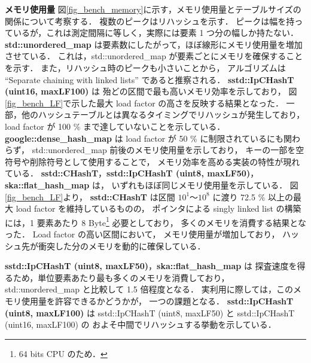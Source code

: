 %
{\bf メモリ使用量}
\samepage\newline\indent
図\ref{fig_bench_memory}に示す，メモリ使用量とテーブルサイズの関係について考察する．
複数のピークはリハッシュを示す．
ピークは幅を持っているが，これは測定間隔に等しく，実際には要素 1 つ分の幅しか持たない．
{\bf std::unordered\_map} は要素数にしたがって，ほぼ線形にメモリ使用量を増加させている．
これは，std::unordered\_map が要素ごとにメモリを確保することを示す．
また，リハッシュ時のピークも小さいことから，
アルゴリズムは ``Separate chaining with linked lists'' であると推察される．
{\bf sstd::IpCHashT (uint16, maxLF100)} は
殆どの区間で最も高いメモリ効率を示しており，
図\ref{fig_bench_LF}で示した最大 load factor の高さを反映する結果となった．
一部，他のハッシュテーブルとは異なるタイミングでリハッシュが発生しており，
load factor が 100 \% まで達していないことを示している．
{\bf google::dense\_hash\_map} は
load factor が 50 \% に制限されているにも関わらず，
std::unordered\_map 前後のメモリ使用量を示しており，
キーの一部を空符号や削除符号として使用することで，
メモリ効率を高める実装の特性が現れている．
{\bf sstd::CHashT}，{\bf sstd::IpCHashT (uint8, maxLF50)}，{\bf ska::flat\_hash\_map} は，
いずれもほぼ同じメモリ使用量を示している．
図\ref{fig_bench_LF}より，
{\bf sstd::CHashT} は区間 $10^1〜10^8$ に渡り 72.5 \% 以上の最大 load factor を維持しているものの，
ポインタによる singly linked list の構築には，1 要素あたり 8 Byte\footnote{64 bits CPU のため．} 必要としており，
多くのメモリを消費する結果となった．
Load factor の高い区間において，
メモリ使用量が増加しており，
ハッシュ先が衝突した分のメモリを動的に確保している．

\noindent
{\bf sstd::IpCHashT (uint8, maxLF50)}，{\bf ska::flat\_hash\_map} は
探査速度を得るため，単位要素あたり最も多くのメモリを消費しており，
std::unordered\_map と比較して 1.5 倍程度となる．
実利用に際しては，このメモリ使用量を許容できるかどうかが，
一つの課題となる．
{\bf sstd::IpCHashT (uint8, maxLF100)} は
sstd::IpCHashT (uint8, maxLF50) と sstd::IpCHashT (uint16, maxLF100) の
およそ中間でリハッシュする挙動を示している．

